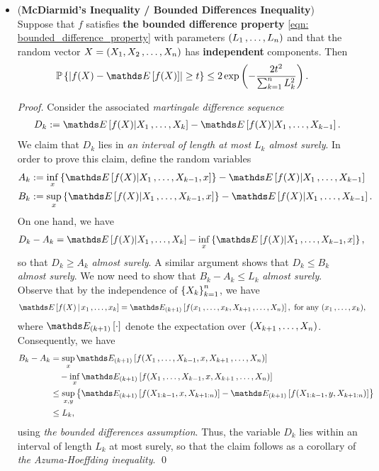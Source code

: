 \documentclass[11pt]{article}
\begin{document}
\begin{itemize}
\item \begin{corollary} (\textbf{McDiarmid's Inequality / Bounded Differences Inequality})\citep{wainwright2019high}\\
Suppose that $f$ satisfies \textbf{the bounded difference property} \eqref{eqn: bounded_difference_property} with parameters $(L_1 \,{,}\ldots{,}\, L_n)$ and that the random vector $X = (X_1, X_2 \,{,}\ldots{,}\, X_n)$ has \textbf{independent} components. Then
\begin{align}
\bP\set{\abs{f(X) - \E{}{f(X)}} \ge t } &\le  2 \exp\paren{- \frac{2 t^2}{ \sum_{k=1}^{n}L_k^2}}. \label{ineqn: macdiarmid_bounded_difference_inequality}
\end{align}
\end{corollary}
\begin{proof}
Consider the associated \emph{martingale difference sequence}
\begin{align*}
D_k := \E{}{f(X) | X_1 \xdotx{,} X_k} - \E{}{f(X) | X_1 \xdotx{,} X_{k-1}}.
\end{align*}
We claim that $D_k$ lies in \emph{an interval of length at most $L_k$ almost surely}. In order to prove this claim, define the random variables
\begin{align*}
A_k &:= \inf_x \set{\E{}{f(X) | X_1 \xdotx{,} X_{k-1}, x}} - \E{}{f(X) | X_1 \xdotx{,} X_{k-1}} \\
B_k &:= \sup_{x} \set{\E{}{f(X) | X_1 \xdotx{,} X_{k-1}, x}} - \E{}{f(X) | X_1 \xdotx{,} X_{k-1}}.
\end{align*}
On one hand, we have
\begin{align*}
D_k - A_k &=  \E{}{f(X) | X_1 \xdotx{,} X_k} - \inf_x \set{\E{}{f(X) | X_1 \xdotx{,} X_{k-1}, x}},
\end{align*}
so that $D_k \ge  A_k$ \emph{almost surely}. A similar argument shows that $D_k \le B_k$ \emph{almost surely}.
We now need to show that $B_k - A_k \le L_k$ \emph{almost surely}. Observe that by the independence of $\left\{X_k\right\}^n_{k=1}$, we have
\begin{align*}
\E{}{f(X) \,|\, x_1 \xdotx{,} x_k } &= \E{(k+1)}{f(x_1 \xdotx{,} x_k, X_{k+1} \xdotx{,} X_n)},\text{ for any }(x_1 \xdotx{,} x_k),
\end{align*}  where $\E{(k+1)}{\cdot}$ denote the expectation over $(X_{k+1} \,{,}\ldots{,}\, X_n)$.
Consequently, we have
\begin{align*}
B_k - A_k &=  \sup_{x} \E{(k+1)}{f(X_1 \xdotx{,} X_{k-1}, x, X_{k+1} \xdotx{,} X_n)}  \\
&\quad - \inf_x  \E{(k+1)}{f(X_1 \xdotx{,} X_{k-1}, x, X_{k+1} \xdotx{,} X_n)} \\
&\le  \sup_{x,y}\set{\E{(k+1)}{f(X_{1:k-1}, x, X_{k+1:n})} - \E{(k+1)}{f(X_{1:k-1}, y, X_{k+1:n})}} \\
&\le L_k,
\end{align*}
using \emph{the bounded differences assumption}. Thus, the variable $D_k$ lies within an interval of length $L_k$ at most surely, so that the claim follows as a corollary of \emph{the Azuma-Hoeffding inequality}. \qed
\end{proof}
\end{itemize}
\end{document}
